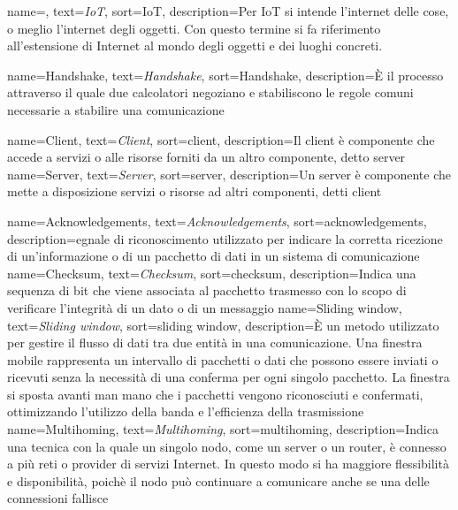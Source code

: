 
 {
    name=,
    text=\emph{IoT},
    sort=IoT,
    description={Per IoT si intende l'internet delle cose, o meglio l'internet degli oggetti. Con questo termine si fa riferimento all'estensione di Internet al mondo degli oggetti e dei luoghi concreti. }
}

 {
    name=Handshake,
    text=\emph{Handshake},
    sort=Handshake,
    description={È il processo attraverso il quale due calcolatori negoziano e stabiliscono le regole comuni necessarie a stabilire una comunicazione}
}

 {
    name=Client,
    text=\emph{Client},
    sort=client,
    description={Il client è componente che accede a servizi o alle risorse forniti da un altro componente, detto \gls{server} }
}
 {
    name=Server,
    text=\emph{Server},
    sort=server,
    description={Un server è componente che mette a disposizione servizi o risorse ad altri componenti, detti \gls{client}}
}

 {
    name=Acknowledgements,
    text=\emph{Acknowledgements},
    sort=acknowledgements,
    description={egnale di riconoscimento utilizzato per indicare la corretta ricezione di un'informazione o di un pacchetto di dati in un sistema di comunicazione}
}
 {
    name=Checksum,
    text=\emph{Checksum},
    sort=checksum,
    description={Indica una sequenza di bit che viene associata al pacchetto trasmesso con lo scopo di verificare l'integrità di un dato o di un messaggio}
}
 {
    name=Sliding window,
    text=\emph{Sliding window},
    sort=sliding window,
    description={È un metodo utilizzato per gestire il flusso di dati tra due entità in una comunicazione. Una finestra mobile rappresenta un intervallo di pacchetti o dati che possono essere inviati o ricevuti senza la necessità di una conferma per ogni singolo pacchetto.
    La finestra si sposta avanti man mano che i pacchetti vengono riconosciuti e confermati, ottimizzando l'utilizzo della banda e l'efficienza della trasmissione}
}
 {
    name=Multihoming,
    text=\emph{Multihoming},
    sort=multihoming,
    description={Indica una tecnica con la quale un singolo nodo, come un server o un router, è connesso a più reti o provider di servizi Internet. In questo modo si ha maggiore flessibilità e disponibilità, poichè il nodo può continuare a comunicare anche se una delle connessioni fallisce}
}

